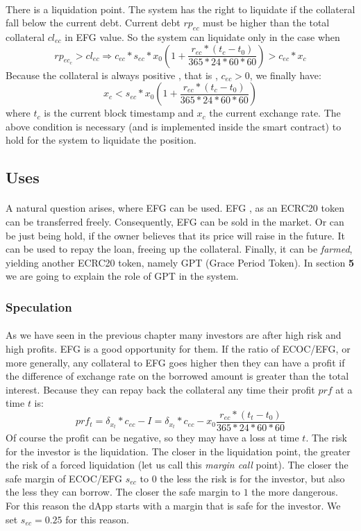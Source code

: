 \documentclass{article}
\begin{document}
\paragraph{ }
There is a liquidation point. The system has the right to liquidate if the collateral fall below the current debt. Current debt $rp_{ec}$  must be higher than the total collateral $cl_{ec}$ in EFG value. So the system can liquidate only in the case when
$$rp_{ec_{c}} > cl_{ec} \Longrightarrow c_{ec}*s_{ec}*x_{0}(1 + \frac{r_{ec}*(t_{c}-t_{0})}{365*24*60*60})>c_{ec}*x_{c}$$
Because the collateral is always positive , that is , $c_{ec}>0$, we finally have:
$$x_{c} < s_{ec}*x_{0}(1 + \frac{r_{ec}*(t_{c}-t_{0})}{365*24*60*60})$$
where $t_{c}$ is the current block timestamp and $x_{c}$ the current exchange rate. The above condition is necessary (and is implemented inside the smart contract) to hold for the system to liquidate the position.

\subsection{Uses}
\paragraph{ }
A natural question arises, where EFG can be used. EFG , as an ECRC20 token can be transferred freely. Consequently, EFG can be sold in the market. Or can be just being hold, if the owner believes that its price will raise in the future. It can be used to repay the loan, freeing up the collateral. Finally, it can be \emph{farmed}, yielding another ECRC20 token, namely GPT (Grace Period Token). In section \textbf{5} we are going to explain the role of GPT in the system.
\subsubsection{Speculation}
\paragraph{ }
As we have seen in the previous chapter many investors are after high risk and high profits. EFG is a good opportunity for them. If the ratio of ECOC/EFG, or more generally, any collateral to EFG goes higher then they can have a profit if the difference of exchange rate on the borrowed amount is greater than the total interest. Because they can repay back the collateral any time their profit $prf$ at a time $t$ is:
$$ prf_{t} = \delta_{x_{t}}*c_{ec} - I = \delta_{x_{t}}*c_{ec} - x_{0} \frac{r_{ec}*(t_{t}-t_{0})}{365*24*60*60}$$
Of course the profit can be negative, so they may have a loss at time $t$. The risk for the investor is the liquidation. The closer in the liquidation point, the greater the risk of a forced liquidation (let us call this \emph{margin call} point). The closer the safe margin of ECOC/EFG $s_{ec}$ to $0$ the less the risk is for the investor, but also the less they can borrow. The closer the safe margin to $1$ the more dangerous. For this reason the dApp starts with a margin that is safe for the investor. We set $s_{ec}=0.25$ for this reason.
\end{document}
